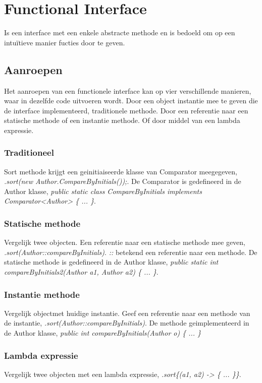 \section{Functional Interface}
Is een interface met een enkele abstracte methode en is bedoeld om op een intuïtieve manier fucties door te geven.

\subsection{Aanroepen}
Het aanroepen van een functionele interface kan op vier verschillende manieren, waar in dezelfde code uitvoeren wordt.
Door een object instantie mee te geven die de interface implementeerd, traditionele methode.
Door een referentie naar een statische methode of een instantie methode.
Of door middel van een lambda expressie.

\subsubsection{Traditioneel}
Sort methode krijgt een geinitiaiseerde klasse van Comparator meegegeven, \textit{.sort(new Author.CompareByInitials());}.
De Comparator is gedefineerd in de Author klasse, \textit{public static class CompareByInitials implements Comparator<Author> \{ ... \}}.

\subsubsection{Statische methode}
Vergelijk twee objecten.
Een referentie naar een statische methode mee geven, \textit{.sort(Author::compareByInitials)}.
\textit{::} betekend een referentie naar een methode.
De statische methode is gedefineerd in de Author klasse, \textit{public static int compareByInitials2(Author a1, Author a2) \{ ... \}}.

\subsubsection{Instantie methode}
Vergelijk objectmet huidige instantie.
Geef een referentie naar een methode van de instantie, \textit{.sort(Author::compareByInitials)}.
De methode geimplementeerd in de Author klasse, \textit{public int compareByInitials(Author o) \{ ... \}}

\subsubsection{Lambda expressie}
Vergelijk twee objecten met een lambda expressie, \textit{.sort\{(a1, a2) -> \{ ... \}\}}.

